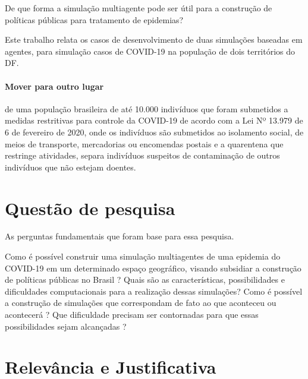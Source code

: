 De que forma a simulação multiagente pode ser útil para a construção de políticas públicas para tratamento de epidemias?


Este trabalho relata os casos de desenvolvimento de duas simulações baseadas em agentes, para simulação casos de COVID-19 na população de dois territórios do DF.


\paragraph{Mover para outro lugar}
de uma população brasileira de até 10.000 indivíduos que foram submetidos a medidas restritivas para controle da COVID-19 de acordo com a Lei Nº 13.979 de 6 de fevereiro de 2020, onde os indivíduos são submetidos ao isolamento social, de meios de transporte, mercadorias ou encomendas postais e a quarentena que restringe atividades, separa indivíduos suspeitos de contaminação de outros indivíduos que não estejam doentes.


\section{Questão de pesquisa}%
As perguntas fundamentais que foram base para essa pesquisa.

Como é possível construir uma simulação multiagentes de uma epidemia do COVID-19 em um determinado espaço geográfico, visando subsidiar a construção de políticas públicas no Brasil ? Quais são as características, possibilidades e dificuldades computacionais para a realização dessas simulações? Como é possível a construção de simulações que correspondam de fato ao que aconteceu ou acontecerá ? Que dificuldade precisam ser contornadas para que essas possibilidades sejam alcançadas ?


\section{Relevância e Justificativa}%

